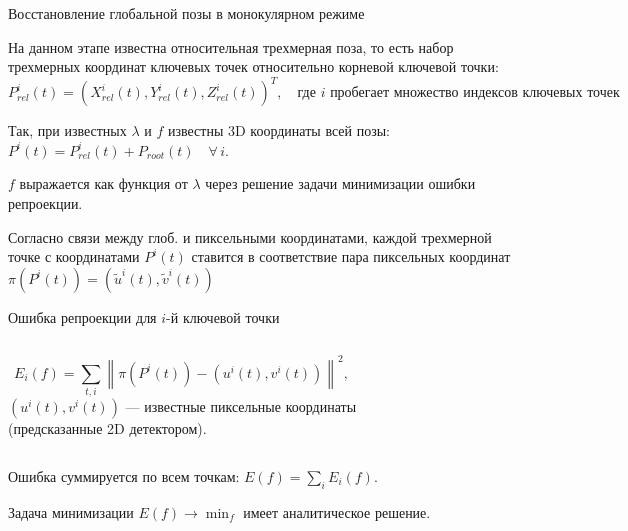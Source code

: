 \documentclass[9pt,aspectratio=169]{beamer}
\begin{document}
\begin{frame}{Восстановление глобальной позы в монокулярном режиме}

На данном этапе известна относительная трехмерная поза, то есть набор
трехмерных координат ключевых точек относительно корневой ключевой точки:
\[
P_{rel}^i(t) = (X^i_{rel}(t), Y^i_{rel}(t), Z^i_{rel}(t))^T, \quad
\text{где $i$ пробегает множество индексов ключевых точек}
\]

Так, при известных $\lambda$ и $f$ известны 3D координаты
всей позы: $P^i(t) = P_{rel}^i(t) + P_{root}(t) \quad \forall \, i$.

\vspace{0.3em}

$f$ выражается как функция от $\lambda$ через решение задачи
минимизации ошибки репроекции.

\vspace{0.3em}

Согласно связи между глоб. и
пиксельными координатами, каждой трехмерной точке с координатами
$P^i(t)$ ставится в соответствие пара пиксельных координат
$\pi(P^i(t)) = (\tilde{u}^i(t), \tilde{v}^i(t))$
\begin{block}{Ошибка репроекции для $i$-й ключевой точки}
\begin{columns}
\[
E_i(f) = \sum_{t,i} \left\| \pi(P^i(t)) - (u^i(t), v^i(t)) \right\|^2,
\]
$(u^i(t), v^i(t))$ --- известные пиксельные координаты \\
(предсказанные 2D детектором).
\end{columns}
\end{block}
Ошибка суммируется по всем точкам: $E(f) = \sum_{i}{E_i(f)}$.

Задача минимизации $E(f) \to \min_f$ имеет
аналитическое решение.

\end{frame}
\end{document}
